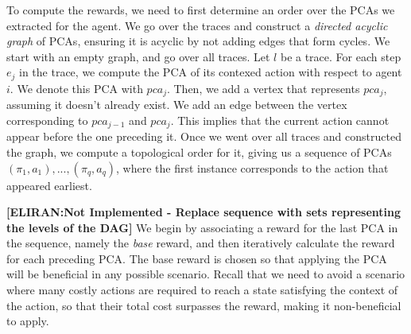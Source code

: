 \documentclass[letterpaper]{article} %
\theoremstyle{definition}
\newcommand{\eliran}[1]{\textbf{[\color{red}ELIRAN:#1]}}
\newcommand{\ronen}[1]{\textbf{[\color{blue}RONEN:#1]}}
\begin{document}
To compute the rewards, we need to first determine an order over the PCAs we extracted for the agent.
We go over the traces and construct a \emph{directed acyclic graph} of PCAs, ensuring it is acyclic by not adding edges that form cycles.
We start with an empty graph, and go over all traces. Let $l$ be a trace.
For each step $e_j$ in the trace, we compute the PCA of its contexed action with respect to agent $i$. We denote this PCA with $pca_j$.
Then, we add a vertex that represents $pca_j$, assuming it doesn't already exist. We add an edge between the vertex corresponding to $pca_{j-1}$ and $pca_j$.
This implies that the current action cannot appear before the one preceding it.
Once we went over all traces and constructed the graph, we compute a topological order
for it, giving us a sequence of PCAs $(\pi_1, a_1),..., (\pi_q, a_q)$, where the first instance corresponds to the action that appeared earliest.

\eliran{Not Implemented - Replace sequence with sets representing the levels of the DAG}
We begin by associating a reward for the last PCA in the sequence, namely the \emph{base} reward, and then iteratively calculate the reward for each preceding PCA.
The base reward is chosen so that applying the PCA will be beneficial in any possible scenario. Recall that we need to avoid a scenario where many costly actions are required to reach a state satisfying the context of the action, so that their total cost surpasses the reward, making it non-beneficial to apply.


\end{document}
